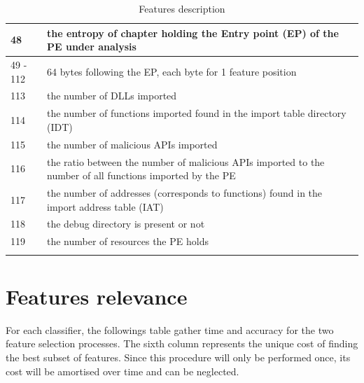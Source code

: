 \begin{appendix}
\begin{longtable}{|l|p{12cm}|}
    48 & the entropy of chapter holding the Entry point (EP) of the PE under analysis\\
    \hline
    49 - 112 & 64 bytes following the EP, each byte for 1 feature position\\
    \hline
    113 & the number of DLLs imported\\
    \hline
    114 & the number of functions imported found in the import table directory (IDT)\\
    \hline
    115 & the number of malicious APIs imported\\
    \hline
    116 & the ratio between the number of malicious APIs imported to the number of all functions imported by the PE\\
    \hline
    117 & the number of addresses (corresponds to functions) found in the import address table (IAT)\\
    \hline
    118 & the debug directory is present or not\\
    \hline
    119 & the number of resources the PE holds\\
    \hline
    \caption{Features description}
    \end{longtable}
    
\chapter{Features relevance}
\label{fs_annexe}
    For each classifier, the followings table gather time and accuracy for the two feature selection processes. The sixth column represents the unique cost of finding the best subset of features. Since this procedure will only be performed once, its cost will be amortised over time and can be neglected.
    \vspace{2cm}
    \begin{table}[!htbp]
    \centering
    \caption{Applying feature selections for the Logistic Regression classifier}
    \label{Tab:tab_logreg}
    \end{table}
    

\end{appendix}
